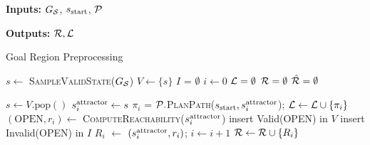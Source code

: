 \documentclass[a4paper,10pt]{article}
\begin{document}
\begin{algorithm}[t]
\hspace*{\algorithmicindent} \textbf{Inputs:} $G_\mathcal{S}$, $s_{\textrm{start}}$, $\mathcal{P}$

\hspace*{\algorithmicindent} \textbf{Outputs:} 
$\mathcal{R}, \mathcal{L}$

\caption{Goal Region Preprocessing}\label{alg:1}
\begin{algorithmic}[1]
  \State $s \leftarrow$\textsc{ SampleValidState}($G_\mathcal{S}$)
  \State $V \leftarrow \{ s \}$    \label{alg:1:v}
  \State $I$ = $\emptyset$    \label{alg:1:i}
  \State $ i \leftarrow 0$
       \hspace{2mm} 
       $\mathcal{L} = \emptyset$
       \hspace{2mm} 
       $\mathcal{R} = \emptyset$
       \hspace{2mm} 
       $\hat{\mathcal{R}} = \emptyset$
       
  \vspace{2mm}
          \State $s \leftarrow V.\text{pop}()$ \label{alg:1:pop}
              \label{alg:1:discard}
        \State $s^{\text{attractor}}_i \leftarrow s$               
        \label{alg:1:attract} 
                \State $\pi_i$ = $\mathcal{P}.$\textsc{PlanPath}($s_{\textrm{start}}, s^{\text{attractor}}_i$); \label{alg:1:pp}
                \hspace{2mm }
                $\mathcal{L} \leftarrow \mathcal{L} \cup \{ \pi_i \}$  \label{alg:1:path}
                \State $(\text{OPEN}, r_i) \leftarrow$ \textsc{ComputeReachability}($s^{\text{attractor}}_i$) \label{alg:1:cr}
                \State insert Valid(OPEN) in $V$  \label{alg:1:insert_v}
                \State insert Invalid(OPEN) in $I$   \label{alg:1:insert_i}
                \State $R_i$ $\leftarrow$ $(s^{\text{attractor}}_i, r_i)$; 
                \hspace{2mm} $ i \leftarrow i+1$        \hspace{2mm }
                $\mathcal{R} \leftarrow \mathcal{R} \cup \{ R_i \}$
                            \EndIf
        \EndWhile


\end{algorithmic}
\end{algorithm}
\end{document}
